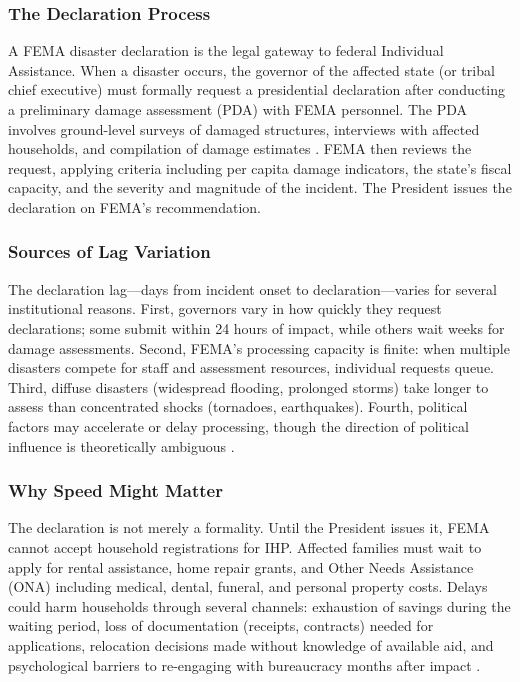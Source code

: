 \documentclass[12pt]{article}
\begin{document}
\subsubsection*{The Declaration Process} A FEMA disaster declaration is the legal gateway to federal Individual Assistance. When a disaster occurs, the governor of the affected state (or tribal chief executive) must formally request a presidential declaration after conducting a preliminary damage assessment (PDA) with FEMA personnel. The PDA involves ground-level surveys of damaged structures, interviews with affected households, and compilation of damage estimates \citep{fema2024}. FEMA then reviews the request, applying criteria including per capita damage indicators, the state's fiscal capacity, and the severity and magnitude of the incident. The President issues the declaration on FEMA's recommendation.

\subsubsection*{Sources of Lag Variation} The declaration lag---days from incident onset to declaration---varies for several institutional reasons. First, governors vary in how quickly they request declarations; some submit within 24 hours of impact, while others wait weeks for damage assessments. Second, FEMA's processing capacity is finite: when multiple disasters compete for staff and assessment resources, individual requests queue. Third, diffuse disasters (widespread flooding, prolonged storms) take longer to assess than concentrated shocks (tornadoes, earthquakes). Fourth, political factors may accelerate or delay processing, though the direction of political influence is theoretically ambiguous \citep{garrett2006, reeves2011, gasper2017}.

\subsubsection*{Why Speed Might Matter} The declaration is not merely a formality. Until the President issues it, FEMA cannot accept household registrations for IHP. Affected families must wait to apply for rental assistance, home repair grants, and Other Needs Assistance (ONA) including medical, dental, funeral, and personal property costs. Delays could harm households through several channels: exhaustion of savings during the waiting period, loss of documentation (receipts, contracts) needed for applications, relocation decisions made without knowledge of available aid, and psychological barriers to re-engaging with bureaucracy months after impact \citep{deryugina2017, gallagher2017}.
\end{document}
